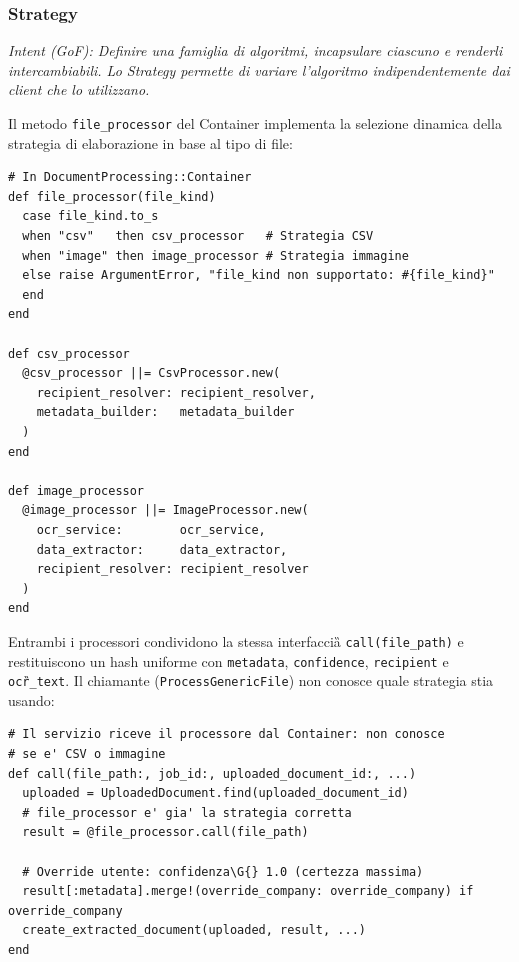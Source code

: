 \documentclass[a4paper,11pt]{article}
\newcommand{\code}[1]{\texttt{#1}}
\begin{document}
\subsubsection{Strategy}
\label{sec:strategy}

\textit{Intent (GoF): Definire una famiglia di algoritmi, incapsulare ciascuno e renderli
intercambiabili. Lo Strategy permette di variare l'algoritmo
indipendentemente dai client che lo utilizzano.}

Il metodo \code{file\_processor} del Container implementa la selezione
dinamica della strategia di elaborazione in base al tipo di file:

\begin{lstlisting}[caption={Strategy -- selezione del processore per tipo file}]
# In DocumentProcessing::Container
def file_processor(file_kind)
  case file_kind.to_s
  when "csv"   then csv_processor   # Strategia CSV
  when "image" then image_processor # Strategia immagine
  else raise ArgumentError, "file_kind non supportato: #{file_kind}"
  end
end

def csv_processor
  @csv_processor ||= CsvProcessor.new(
    recipient_resolver: recipient_resolver,
    metadata_builder:   metadata_builder
  )
end

def image_processor
  @image_processor ||= ImageProcessor.new(
    ocr_service:        ocr_service,
    data_extractor:     data_extractor,
    recipient_resolver: recipient_resolver
  )
end
\end{lstlisting}

Entrambi i processori condividono la stessa interfaccia\G{} \code{call(file\_path)}
e restituiscono un hash uniforme con \code{metadata}, \code{confidence},
\code{recipient} e \code{ocr\G{}\_text}. Il chiamante (\code{ProcessGenericFile})
non conosce quale strategia stia usando:

\begin{lstlisting}[caption={ProcessGenericFile -- polimorfismo tramite Strategy}]
# Il servizio riceve il processore dal Container: non conosce
# se e' CSV o immagine
def call(file_path:, job_id:, uploaded_document_id:, ...)
  uploaded = UploadedDocument.find(uploaded_document_id)
  # file_processor e' gia' la strategia corretta
  result = @file_processor.call(file_path)

  # Override utente: confidenza\G{} 1.0 (certezza massima)
  result[:metadata].merge!(override_company: override_company) if override_company
  create_extracted_document(uploaded, result, ...)
end
\end{lstlisting}
\end{document}
